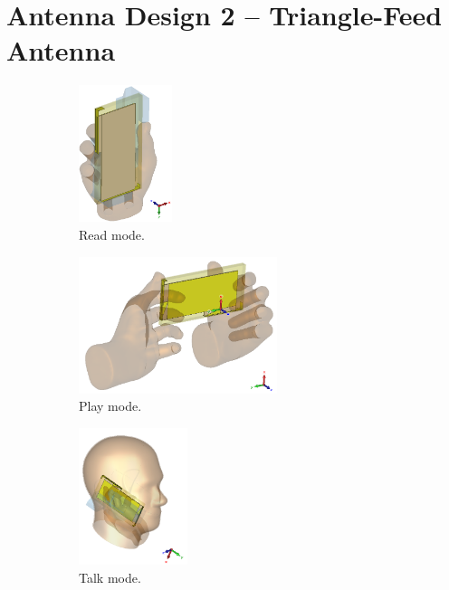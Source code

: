\section{Antenna Design 2 -- Triangle-Feed Antenna}
\begin{figure}[htbp]
    \centering
    \begin{subfigure}[b]{0.24\linewidth}
        \centering
        \includegraphics[width=\linewidth,height=4cm,keepaspectratio]{img/tech_sol/trianglefeed/read_mode/3d.PNG}
        \caption{Read mode.}
    \end{subfigure}
    \begin{subfigure}[b]{0.24\linewidth}
        \centering
        \includegraphics[width=\linewidth,height=4cm,keepaspectratio]{img/tech_sol/trianglefeed/play_mode/3d.PNG}
        \caption{Play mode.}
    \end{subfigure}
    \begin{subfigure}[b]{0.24\linewidth}
        \centering
        \includegraphics[width=\linewidth,height=4cm,keepaspectratio]{img/tech_sol/trianglefeed/talk_mode/3d.PNG}
        \caption{Talk mode.}
    \end{subfigure}
    \begin{subfigure}[b]{0.24\linewidth}

\end{subfigure}
\end{figure}
